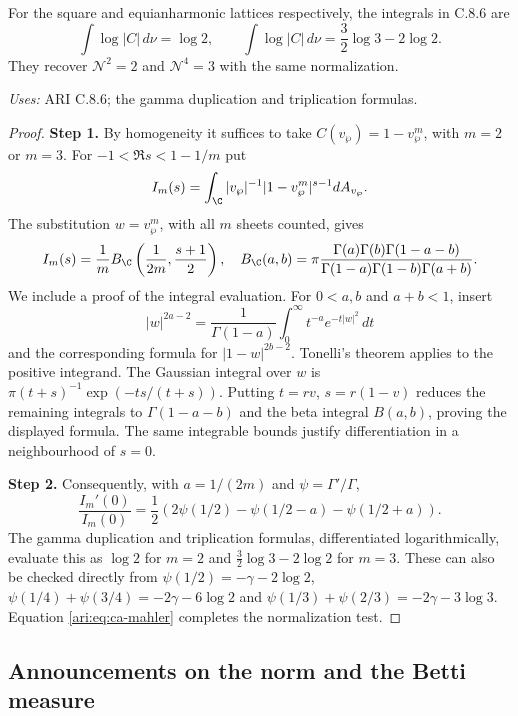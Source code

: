 \begin{proposition}\label{ari:C.8.7}
For the square and equianharmonic lattices respectively, the
integrals in C.8.6 are
\[
 \int\log|C|\,d\nu=\log2,\qquad
 \int\log|C|\,d\nu=\frac32\log3-2\log2.
\]
They recover $\mathcal N^2=2$ and $\mathcal N^4=3$ with the same normalization.
\end{proposition}
\noindent\textit{Uses:} ARI C.8.6; the gamma duplication and triplication formulas.\par
\begin{proof}
\noindent\textbf{Step 1.} By homogeneity it suffices to take $C(v_{\wp})=1-v_{\wp}^m$, with $m=2$
or $m=3$. For $-1<\Re s<1-1/m$ put
\[
 I_m(s)=\int_{\C} |v_{\wp}|^{-1}|1-v_{\wp}^m|^{s-1}dA_{v_{\wp}}.
\]
The substitution $w=v_{\wp}^m$, with all $m$ sheets counted, gives
\[
 I_m(s)=\frac1m B_{\C}\left(\frac1{2m},\frac{s+1}2\right),
 \quad
 B_{\C}(a,b)=\pi\frac{\Gamma(a)\Gamma(b)\Gamma(1-a-b)}
                   {\Gamma(1-a)\Gamma(1-b)\Gamma(a+b)}.
\]
We include a proof of the integral evaluation. For
$0<a,b$ and $a+b<1$, insert
\[
 |w|^{2a-2}=\frac1{\Gamma(1-a)}
       \int_0^\infty t^{-a}e^{-t|w|^2}\,dt
\]
and the corresponding formula for $|1-w|^{2b-2}$.
Tonelli's theorem applies to the positive integrand. The
Gaussian integral over $w$ is
$\pi(t+s)^{-1}\exp(-ts/(t+s))$.
Putting $t=rv$, $s=r(1-v)$ reduces the remaining integrals
to $\Gamma(1-a-b)$ and the beta integral $B(a,b)$, proving
the displayed formula. The same integrable bounds justify
differentiation in a neighbourhood of $s=0$.


\noindent\textbf{Step 2.} Consequently, with $a=1/(2m)$ and $\psi=\Gamma'/\Gamma$,
\[
 \frac{I_m'(0)}{I_m(0)}
 =\frac12\left(2\psi(1/2)-\psi(1/2-a)-\psi(1/2+a)\right).
\]
The gamma duplication and triplication formulas, differentiated
logarithmically, evaluate this as $\log2$ for $m=2$ and
$\frac32\log3-2\log2$ for $m=3$. These can also be checked
directly from
$\psi(1/2)=-\gamma-2\log2$,
$\psi(1/4)+\psi(3/4)=-2\gamma-6\log2$ and
$\psi(1/3)+\psi(2/3)=-2\gamma-3\log3$.
Equation \eqref{ari:eq:ca-mahler} completes the normalization test.
\end{proof}

\subsection{Announcements on the norm and the Betti measure}

